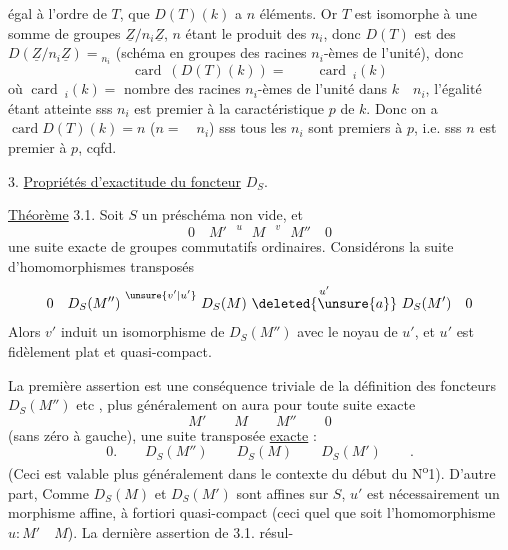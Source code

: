 égal à l'ordre  de $T$, que $D(T)(k)$ a  $n$ éléments. Or $T$ est isomorphe à une somme de groupes $\underline Z/n_i\underline Z$, $n$ étant le produit des $n_i$, donc $D(T)$ est  des $D(\underline Z/n_i\underline Z)={}_{n_i}$ (schéma en groupes des racines $n_i$-èmes de l'unité), donc
\[
 \operatorname{card}\ (D(T)(k))=\qquad\operatorname{card}\ {}_i(k)
\]
où $\operatorname{card}\ {}_i(k)={}$ nombre des racines $n_i$-èmes de l'unité dans $k\quad n_i$, l'égalité étant atteinte sss $n_i$ est premier à la caractéristique $p$ de $k$. Donc on a $\operatorname{card} D(T)(k)=n$  ($n=\quad n_i$) sss tous les $n_i$ sont premiers à $p$, i.e. sss $n$ est premier à $p$, cqfd.

3. \uline{Propriétés d'exactitude du foncteur} $D_S$.

\uline{Théorème} 3.1. Soit $S$ un préschéma non vide,  et
\[
 0\quad M'\ \overset{u}{\phantom{=}}\ M\ \overset{v}{\phantom{=}}\ M''\quad 0
\]
une suite exacte de groupes commutatifs ordinaires. Considérons la suite d'homomorphismes transposés
\[
 0\quad D_S(M'')\ \overset{\unsure{v'|u'}}{\phantom{=}}\ D_S(M)\
 \overset{u'}{\deleted{\unsure{a}}}\ D_S(M')\quad0
\]
Alors $v'$ induit un isomorphisme de  $D_S(M'')$ avec le noyau de $u'$, et $u'$ est fidèlement plat et quasi-compact.

La première assertion est une conséquence triviale de la définition des foncteurs $D_S(M'')$ etc , plus généralement\unsure{,} on aura pour toute suite exacte
\[
 M'\qquad M\qquad M''\qquad 0
\]
(sans zéro à gauche), une suite transposée \uline{exacte} :
\[
 0.\qquad D_S(M'')\qquad D_S(M)\qquad D_S(M')\qquad .
\]
(Ceci est valable plus généralement dans le contexte du début du N\textsuperscript{o}1).
D'autre part, Comme $D_S(M)$ et $D_S(M')$ sont affines sur $S$, $u'$ est nécessairement un morphisme affine, à fortiori quasi-compact (ceci quel que soit l'homomorphisme $u:M'\quad M$). La dernière assertion de 3.1. résul-
